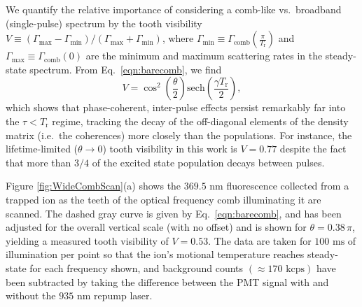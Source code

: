 \documentclass[preprint,superscriptaddress,amsmath,amssymb,aps,prl]{revtex4-1}
\begin{document}
We quantify the relative importance of considering a comb-like vs.\ broadband (single-pulse) spectrum by the tooth visibility $V \equiv (\Gamma_\mathrm{max} - \Gamma_\mathrm{min}) / (\Gamma_\mathrm{max} + \Gamma_\mathrm{min})$, where $\Gamma_\mathrm{min}\equiv\Gamma_\mathrm{comb}(\frac{\pi}{T_\mathrm{r}})$ and $\Gamma_\mathrm{max}\equiv\Gamma_\mathrm{comb}(0)$ are the minimum and maximum scattering rates in the steady-state spectrum.  From Eq.~\ref{eqn:barecomb}, we find
\begin{equation}
V = \cos^2\left( \frac{\theta}{2}\right) \mathrm{sech}\left( \frac{\gamma T_\mathrm{r}}{2}\right),\label{eqn:Visibility}
\end{equation}
which shows that phase-coherent, inter-pulse effects persist remarkably far into the $\tau < T_\mathrm{r}$ regime, tracking the decay of the off-diagonal elements of the density matrix (i.e.\ the coherences) more closely than the populations.  For instance, the lifetime-limited ($\theta \!\!\rightarrow \!\!0$) tooth visibility in this work is $V=0.77$ despite the fact that more than $3/4$ of the excited state population decays between pulses.

Figure \ref{fig:WideCombScan}(a) shows the $369.5\mbox{ nm}$ fluorescence collected from a trapped ion as the teeth of the optical frequency comb illuminating it are scanned. The dashed gray curve is given by Eq.~\ref{eqn:barecomb}, and has been adjusted for the overall vertical scale (with no offset) and is shown for $\theta = 0.38\, \pi$, yielding a measured tooth visibility of $V=0.53$. The data are taken for $100 \mbox{ ms}$ of illumination per point so that the ion's motional temperature reaches steady-state for each frequency shown, and background counts $(\approx 170 \mbox{ kcps})$ have been subtracted by taking the difference between the PMT signal with and without the $935 \mbox{ nm}$ repump laser.
\end{document}
